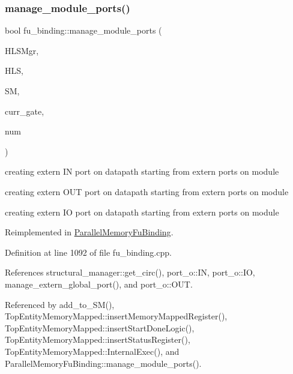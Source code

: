\subsubsection{\texorpdfstring{manage\+\_\+module\+\_\+ports()}{manage\_module\_ports()}}
{\footnotesize\ttfamily bool fu\+\_\+binding\+::manage\+\_\+module\+\_\+ports (\begin{DoxyParamCaption}\item[{const \hyperlink{hls__manager_8hpp_acd3842b8589fe52c08fc0b2fcc813bfe}{H\+L\+S\+\_\+manager\+Ref}}]{H\+L\+S\+Mgr,  }\item[{const \hyperlink{hls_8hpp_a75d0c73923d0ddfa28c4843a802c73a7}{hls\+Ref}}]{H\+LS,  }\item[{const \hyperlink{structural__manager_8hpp_ab3136f0e785d8535f8d252a7b53db5b5}{structural\+\_\+manager\+Ref}}]{SM,  }\item[{const \hyperlink{structural__objects_8hpp_a8ea5f8cc50ab8f4c31e2751074ff60b2}{structural\+\_\+object\+Ref}}]{curr\+\_\+gate,  }\item[{unsigned int}]{num }\end{DoxyParamCaption})\hspace{0.3cm}{\ttfamily [virtual]}}

creating extern IN port on datapath starting from extern ports on module

creating extern O\+UT port on datapath starting from extern ports on module

creating extern IO port on datapath starting from extern ports on module 

Reimplemented in \hyperlink{classParallelMemoryFuBinding_a1e98fb5e73a6fb77e0b26e4bdf5d3ba3}{Parallel\+Memory\+Fu\+Binding}.



Definition at line 1092 of file fu\+\_\+binding.\+cpp.



References structural\+\_\+manager\+::get\+\_\+circ(), port\+\_\+o\+::\+IN, port\+\_\+o\+::\+IO, manage\+\_\+extern\+\_\+global\+\_\+port(), and port\+\_\+o\+::\+O\+UT.



Referenced by add\+\_\+to\+\_\+\+S\+M(), Top\+Entity\+Memory\+Mapped\+::insert\+Memory\+Mapped\+Register(), Top\+Entity\+Memory\+Mapped\+::insert\+Start\+Done\+Logic(), Top\+Entity\+Memory\+Mapped\+::insert\+Status\+Register(), Top\+Entity\+Memory\+Mapped\+::\+Internal\+Exec(), and Parallel\+Memory\+Fu\+Binding\+::manage\+\_\+module\+\_\+ports().

